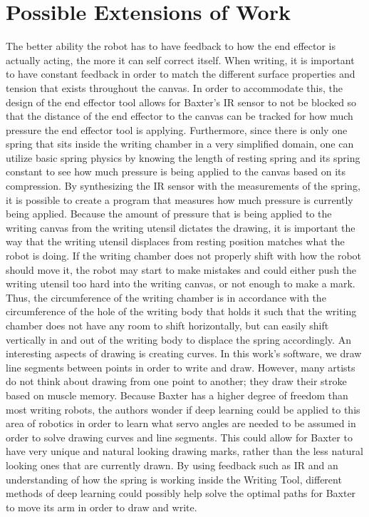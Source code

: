 \documentclass[letterpaper]{article}
\begin{document}
\section{Possible Extensions of Work}
The better ability the robot has to have feedback to how the end effector is actually acting, the more it can self correct itself. When writing, it is important to have constant feedback in order to match the different surface properties and tension that exists throughout the canvas. In order to accommodate this, the design of the end effector tool allows for Baxter’s IR sensor to not be blocked so that the distance of the end effector to the canvas can be tracked for how much pressure the end effector tool is applying. Furthermore, since there is only one spring that sits inside the writing chamber in a very simplified domain, one can utilize basic spring physics by knowing the length of resting spring and its spring constant to see how much pressure is being applied to the canvas based on its compression. By synthesizing the IR sensor with the measurements of the spring, it is possible to create a program that measures how much pressure is currently being applied.  Because the amount of pressure that is being applied to the writing canvas from the writing utensil dictates the drawing, it is important the way that the writing utensil displaces from resting position matches what the robot is doing. If the writing chamber does not properly shift with how the robot should move it, the robot may start to make mistakes and could either push the writing utensil too hard into the writing canvas, or not enough to make a mark. Thus, the circumference of the writing chamber is in accordance with the circumference of the hole of the writing body that holds it such that the writing chamber does not have any room to shift horizontally, but can easily shift vertically in and out of the writing body to displace the spring accordingly. An interesting aspects of drawing is creating curves. In this work's software, we draw line segments between points in order to write and draw. However, many artists do not think about drawing from one point to another; they draw their stroke based on muscle memory. Because Baxter has a higher degree of freedom than most writing robots, the authors wonder if deep learning could be applied to this area of robotics in order to learn what servo angles are needed to be assumed in order to solve drawing curves and line segments. This could allow for Baxter to have very unique and natural looking drawing marks, rather than the less natural looking ones that are currently drawn. By using feedback such as IR and an understanding of how the spring is working inside the Writing Tool, different methods of deep learning could possibly help solve the optimal paths for Baxter to move its arm in order to draw and write.


{\small
 
}
\end{document}
